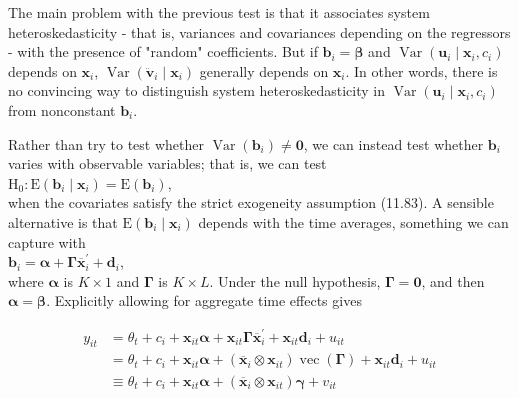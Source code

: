 \documentclass[10pt]{article}
\begin{document}
The main problem with the previous test is that it associates system heteroskedasticity - that is, variances and covariances depending on the regressors - with the presence of "random" coefficients. But if $\mathbf{b}_{i}=\boldsymbol{\beta}$ and $\operatorname{Var}\left(\mathbf{u}_{i} \mid \mathbf{x}_{i}, c_{i}\right)$ depends on $\mathbf{x}_{i}$, $\operatorname{Var}\left(\ddot{\mathbf{v}}_{i} \mid \mathbf{x}_{i}\right)$ generally depends on $\mathbf{x}_{i}$. In other words, there is no convincing way to distinguish system heteroskedasticity in $\operatorname{Var}\left(\mathbf{u}_{i} \mid \mathbf{x}_{i}, c_{i}\right)$ from nonconstant $\mathbf{b}_{i}$.

Rather than try to test whether $\operatorname{Var}\left(\mathbf{b}_{i}\right) \neq \mathbf{0}$, we can instead test whether $\mathbf{b}_{i}$ varies with observable variables; that is, we can test\\
$\mathrm{H}_{0}: \mathrm{E}\left(\mathbf{b}_{i} \mid \mathbf{x}_{i}\right)=\mathrm{E}\left(\mathbf{b}_{i}\right)$,\\
when the covariates satisfy the strict exogeneity assumption (11.83). A sensible alternative is that $\mathrm{E}\left(\mathbf{b}_{i} \mid \mathbf{x}_{i}\right)$ depends with the time averages, something we can capture with\\
$\mathbf{b}_{i}=\boldsymbol{\alpha}+\boldsymbol{\Gamma} \overline{\mathbf{x}}_{i}^{\prime}+\mathbf{d}_{i}$,\\
where $\boldsymbol{\alpha}$ is $K \times 1$ and $\boldsymbol{\Gamma}$ is $K \times L$. Under the null hypothesis, $\boldsymbol{\Gamma}=\mathbf{0}$, and then $\boldsymbol{\alpha}=\boldsymbol{\beta}$. Explicitly allowing for aggregate time effects gives


\begin{align*}
y_{i t} & =\theta_{t}+c_{i}+\mathbf{x}_{i t} \boldsymbol{\alpha}+\mathbf{x}_{i t} \boldsymbol{\Gamma} \overline{\mathbf{x}}_{i}^{\prime}+\mathbf{x}_{i t} \mathbf{d}_{i}+u_{i t} \\
& =\theta_{t}+c_{i}+\mathbf{x}_{i t} \boldsymbol{\alpha}+\left(\overline{\mathbf{x}}_{i} \otimes \mathbf{x}_{i t}\right) \operatorname{vec}(\boldsymbol{\Gamma})+\mathbf{x}_{i t} \mathbf{d}_{i}+u_{i t} \\
& \equiv \theta_{t}+c_{i}+\mathbf{x}_{i t} \boldsymbol{\alpha}+\left(\overline{\mathbf{x}}_{i} \otimes \mathbf{x}_{i t}\right) \boldsymbol{\gamma}+v_{i t} \tag{11.96}
\end{align*}
\end{document}
